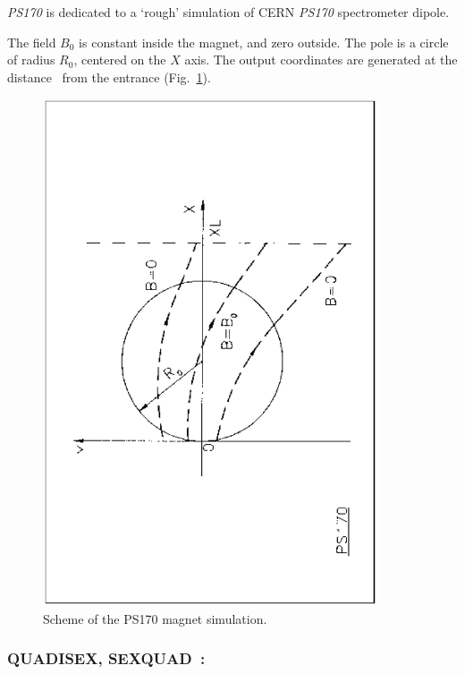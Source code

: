 {\textsl{PS170} is dedicated to a `rough' simulation
of CERN \textsl{PS170} spectrometer dipole.  
\medskip

\noindent The field $ B_0 $ is constant inside the magnet, and zero outside. 
The pole is a circle  of radius $ R_0 $, centered on the $ X $ axis.  The output coordinates are
generated at the distance \XL\ from the entrance (Fig.~\ref{fig25}).  %
\vfill

\begin{figure}[H]
\centerline{\includegraphics[height=15cm,angle=-90]{Fig25.ps}}
\caption{\label{fig25}Scheme of the PS170 magnet simulation.}
\end{figure}

\vfill

\newpage

\subsubsection*{QUADISEX, SEXQUAD~: \QUADISEXTitl} \label{QUADISEX}\label{SEXQUAD}
\medskip 
{} 

}
